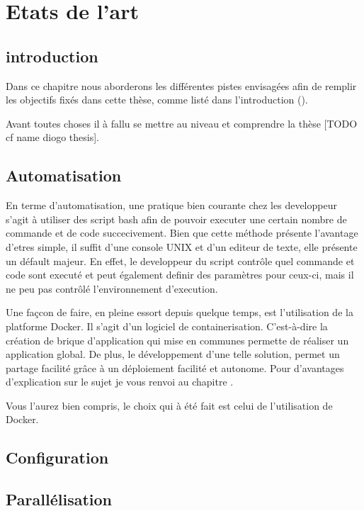 \chapter{Etats de l'art}
\label{ch:state_art}

\section{introduction}
Dans ce chapitre nous aborderons les différentes pistes envisagées afin de remplir les objectifs fixés dans cette thèse, comme listé dans l'introduction ().

Avant toutes choses il à fallu se mettre au niveau et comprendre la thèse [TODO cf name diogo thesis].

\section{Automatisation}
En terme d'automatisation, une pratique bien courante chez les developpeur s'agit à utiliser des script bash afin de pouvoir executer une certain nombre de commande et de code succecivement. Bien que cette méthode présente l'avantage d'etres simple, il suffit d'une console UNIX et d'un editeur de texte, elle présente un défault majeur. En effet, le developpeur du script contrôle quel commande et code sont executé et peut également definir des paramètres pour ceux-ci, mais il ne peu pas contrôlé l'environnement d'execution.

Une façcon de faire, en pleine essort depuis quelque temps, est l'utilisation de la platforme Docker. Il s'agit d'un logiciel de containerisation. C'est-à-dire la création de brique d'application qui mise en communes permette de réaliser un application global. De plus, le développement d'une telle solution, permet un partage facilité grâce à un déploiement facilité et autonome. Pour d'avantages d'explication sur le sujet je vous renvoi au chapitre  .

Vous l'aurez bien compris, le choix qui à été fait est celui de l'utilisation de Docker.

\section{Configuration}


\section{Parallélisation}
	

